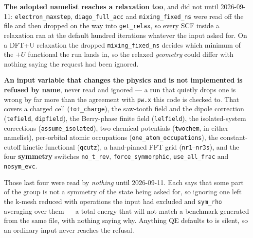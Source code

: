 \documentclass[11pt,a4paper]{article}
\newcommand{\code}[1]{\texttt{\small #1}}
\begin{document}
\textbf{The adopted namelist reaches a relaxation too}, and did not until
2026-09-11: \code{electron\_maxstep}, \code{diago\_full\_acc} and
\code{mixing\_fixed\_ns} were read off the file and then dropped on the way into
\code{get\_relax}, so every SCF inside a relaxation ran at the default hundred
iterations whatever the input asked for. On a DFT+U relaxation the dropped
\code{mixing\_fixed\_ns} decides which minimum of the $+U$ functional the run
lands in, so the relaxed \emph{geometry} could differ with nothing saying the
request had been ignored.

\begin{refuses}
\textbf{An input variable that changes the physics and is not implemented is
refused by name}, never read and ignored --- a run that quietly drops one is
wrong by far more than the agreement with \code{pw.x} this code is checked to.
That covers a charged cell (\code{tot\_charge}), the saw-tooth field and the
dipole correction (\code{tefield}, \code{dipfield}), the Berry-phase finite
field (\code{lelfield}), the isolated-system corrections
(\code{assume\_isolated}), two chemical potentials (\code{twochem}, in either
namelist), per-orbital atomic occupations
(\code{one\_atom\_occupations}), the constant-cutoff kinetic functional
(\code{qcutz}), a hand-pinned FFT grid (\code{nr1}--\code{nr3s}), and the four
\textbf{symmetry} switches \code{no\_t\_rev}, \code{force\_symmorphic},
\code{use\_all\_frac} and \code{nosym\_evc}.

Those last four were read by \emph{nothing} until 2026-09-11. Each says that
some part of the group is not a symmetry of the state being asked for, so
ignoring one left the k-mesh reduced with operations the input had excluded and
\code{sym\_rho} averaging over them --- a total energy that will not match a
benchmark generated from the same file, with nothing saying why. Anything QE
defaults to is silent, so an ordinary input never reaches the refusal.


\end{refuses}
\end{document}
